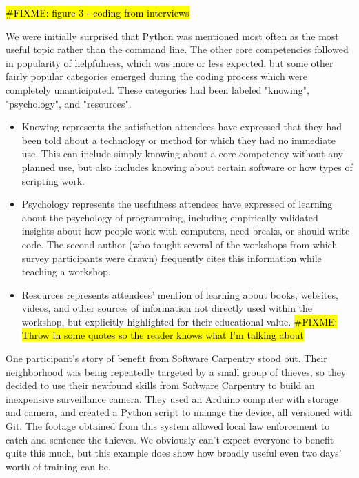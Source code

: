 \documentclass[10pt,twocolumn,submission,copyright,creativecommons]{article}
\newcommand{\fixme}[1]{\hl{\#FIXME: #1}}
\begin{document}
\fixme{figure 3 - coding from interviews}

We were initially surprised that Python was mentioned most often as the most useful topic rather than the command line.
The other core competencies followed in popularity of helpfulness,
which was more or less expected,
but some other fairly popular categories emerged during the coding process which were completely unanticipated.
These categories had been labeled "knowing", "psychology", and "resources".

\begin{itemize}
    \item
    Knowing represents the satisfaction attendees have expressed that they had been told about a technology or method
    for which they had no immediate use.
    This can include simply knowing about a core competency without any planned use,
    but also includes knowing about certain software or how types of scripting work.
    
    \item
    Psychology represents the usefulness attendees have expressed of learning about the psychology of programming,
    including empirically validated insights about how people work with computers,
    need breaks,
    or should write code.
    The second author (who taught several of the workshops from which survey participants were drawn)
    frequently cites this information while teaching a workshop.
    
    \item
    Resources represents attendees' mention of learning about books, websites, videos, and other sources of information
    not directly used within the workshop,
    but explicitly highlighted for their educational value.
    \fixme{Throw in some quotes so the reader knows what I'm talking about}
\end{itemize}

One participant's story of benefit from Software Carpentry stood out.
Their neighborhood was being repeatedly targeted by a small group of thieves,
so they decided to use their newfound skills from Software Carpentry to build an inexpensive surveillance camera.
They used an Arduino computer with storage and camera,
and created a Python script to manage the device,
all versioned with Git.
The footage obtained from this system allowed local law enforcement to catch and sentence the thieves.
We obviously can't expect everyone to benefit quite this much,
but this example does show how broadly useful even two days' worth of training can be.
\end{document}
